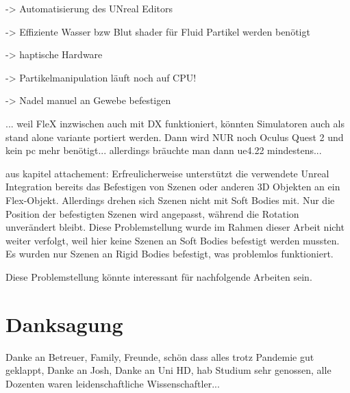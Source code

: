 -> Automatisierung des UNreal Editors

-> Effiziente Wasser bzw Blut shader für Fluid Partikel werden benötigt

-> haptische Hardware

-> Partikelmanipulation läuft noch auf CPU!

-> Nadel manuel an Gewebe befestigen

... weil FleX inzwischen auch mit DX funktioniert, könnten Simulatoren auch als stand alone variante portiert werden. Dann wird NUR  noch Oculus Quest 2 und kein pc mehr benötigt... allerdings bräuchte man dann ue4.22 mindestens...

aus kapitel attachement:
Erfreulicherweise unterstützt die verwendete Unreal Integration bereits das Befestigen von Szenen oder anderen 3D Objekten an ein Flex-Objekt. Allerdings drehen sich Szenen nicht mit Soft Bodies mit. Nur die Position der befestigten Szenen wird angepasst, während die Rotation unverändert bleibt. 
Diese Problemstellung wurde im Rahmen dieser Arbeit nicht weiter verfolgt, weil hier keine Szenen an Soft Bodies befestigt werden mussten. Es wurden nur Szenen an Rigid Bodies befestigt, was problemlos funktioniert.

Diese Problemstellung könnte interessant für nachfolgende Arbeiten sein.

\section{Danksagung}
Danke an Betreuer, Family, Freunde, schön dass alles trotz Pandemie gut geklappt, Danke an Josh, Danke an Uni HD, hab Studium sehr genossen, alle Dozenten waren leidenschaftliche Wissenschaftler...


